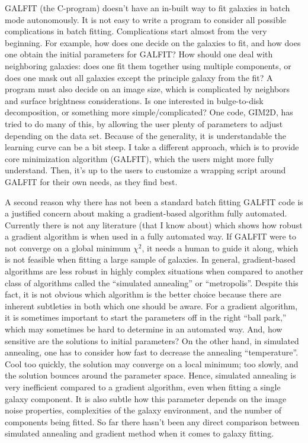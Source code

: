 \documentclass[preprint]{aastex}
\begin{document}
GALFIT (the C-program) doesn't have an in-built way to fit galaxies in batch
mode autonomously.  It is not easy to write a program to consider all possible
complications in batch fitting.  Complications start almost from the very
beginning.  For example, how does one decide on the galaxies to fit, and how
does one obtain the initial parameters for GALFIT?  How should one deal with
neighboring galaxies:  does one fit them together using multiple components,
or does one mask out all galaxies except the principle galaxy from the fit?  A
program must also decide on an image size, which is complicated by neighbors
and surface brightness considerations.  Is one interested in bulge-to-disk
decomposition, or something more simple/complicated?  One code, GIM2D, has
tried to do many of this, by allowing the user plenty of parameters to adjust
depending on the data set.  Because of the generality, it is understandable
the learning curve can be a bit steep.  I take a different approach, which is
to provide core minimization algorithm (GALFIT), which the users might more
fully understand.  Then, it's up to the users to customize a wrapping script
around GALFIT for their own needs, as they find best.

A second reason why there has not been a standard batch fitting GALFIT code is
a justified concern about making a gradient-based algorithm fully automated.
Currently there is not any literature (that I know about) which shows how
robust a gradient algorithm is when used in a fully automated way.  If GALFIT
were to not converge on a global minimum $\chi^2$, it needs a human to guide
it along, which is not feasible when fitting a large sample of galaxies.  In
general, gradient-based algorithms are less robust in highly complex
situations when compared to another class of algorithms called the ``simulated
annealing'' or ``metropolis''.  Despite this fact, it is not obvious which
algorithm is the better choice because there are inherent subtleties in both
which one should be aware.  For a gradient algorithm, it is sometimes
important to start the parameters off in the right ``ball park,'' which may
sometimes be hard to determine in an automated way.  And, how sensitive are
the solutions to initial parameters?  On the other hand, in simulated
annealing, one has to consider how fast to decrease the annealing
``temperature''.  Cool too quickly, the solution may converge on a local
minimum; too slowly, and the solution bounces around the parameter space.
Hence, simulated annealing is very inefficient compared to a gradient
algorithm, even when fitting a single galaxy component.  It is also subtle how
this parameter depends on the image noise properties, complexities of the
galaxy environment, and the number of components being fitted.  So far there
hasn't been any direct comparison between simulated annealing and gradient
method when it comes to galaxy fitting.
\end{document}

